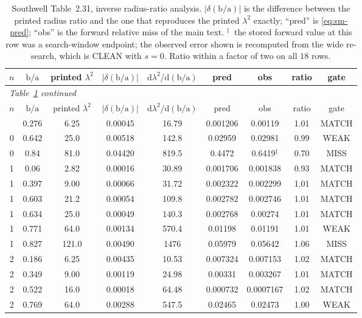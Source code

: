 \documentclass[11pt]{article}
\newcommand{\lamsq}{\lambda^{2}}
\newcommand{\ba}{\mbox{b/a}}
\begin{document}
\begin{center}\small
\begin{longtable}{ccccccccc}
\caption{Southwell Table~2.31, inverse radius-ratio analysis.
$|\delta(\ba)|$ is the difference between the printed radius ratio and the one
that reproduces the printed $\lamsq$ exactly; ``pred'' is
\eqref{eq:sm-pred}; ``obs'' is the forward relative miss of the main text.
$^{\ddagger}$~the stored forward value at this row was a search-window
endpoint; the observed error shown is recomputed from the wide re-search,
which is CLEAN with $s=0$. Ratio within a factor of two on all $18$ rows.}
\label{tab:sm-inverse}\\
\toprule
$n$ & $\ba$ & printed $\lamsq$ & $|\delta(\ba)|$
& $\mathrm{d}\lamsq/\mathrm{d}(\ba)$ & pred & obs & ratio & gate\\
\midrule
\endfirsthead
\multicolumn{9}{l}{\textit{Table~\ref{tab:sm-inverse} continued}}\\
\toprule
$n$ & $\ba$ & printed $\lamsq$ & $|\delta(\ba)|$
& $\mathrm{d}\lamsq/\mathrm{d}(\ba)$ & pred & obs & ratio & gate\\
\midrule
\endhead
\bottomrule
\endfoot
\bottomrule
\endlastfoot
0 & 0.276 & 6.25 & 0.00045 & 16.79 & 0.001206 & 0.00119 & 1.01 & MATCH \\
0 & 0.642 & 25.0 & 0.00518 & 142.8 & 0.02959 & 0.02981 & 0.99 & WEAK \\
0 & 0.84 & 81.0 & 0.04420 & 819.5 & 0.4472 & 0.6419$^{\ddagger}$ & 0.70 & MISS \\
1 & 0.06 & 2.82 & 0.00016 & 30.89 & 0.001706 & 0.001838 & 0.93 & MATCH \\
1 & 0.397 & 9.00 & 0.00066 & 31.72 & 0.002322 & 0.002299 & 1.01 & MATCH \\
1 & 0.603 & 21.2 & 0.00054 & 109.8 & 0.002782 & 0.002746 & 1.01 & MATCH \\
1 & 0.634 & 25.0 & 0.00049 & 140.3 & 0.002768 & 0.00274 & 1.01 & MATCH \\
1 & 0.771 & 64.0 & 0.00134 & 570.4 & 0.01198 & 0.01191 & 1.01 & WEAK \\
1 & 0.827 & 121.0 & 0.00490 & 1476 & 0.05979 & 0.05642 & 1.06 & MISS \\
2 & 0.186 & 6.25 & 0.00435 & 10.53 & 0.007324 & 0.007153 & 1.02 & MATCH \\
2 & 0.349 & 9.00 & 0.00119 & 24.98 & 0.00331 & 0.003267 & 1.01 & MATCH \\
2 & 0.522 & 16.0 & 0.00018 & 64.48 & 0.000732 & 0.0007167 & 1.02 & MATCH \\
2 & 0.769 & 64.0 & 0.00288 & 547.5 & 0.02465 & 0.02473 & 1.00 & WEAK \\

\end{longtable}
\end{center}
\end{document}
